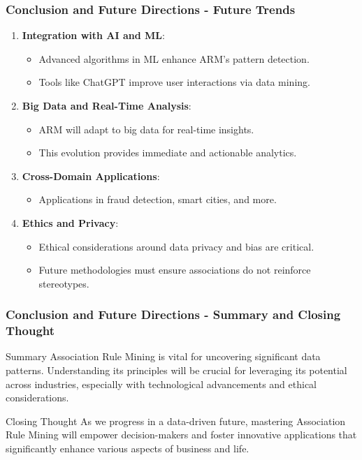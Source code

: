 \documentclass[aspectratio=169]{beamer}
\begin{document}
\begin{frame}[fragile]
    \frametitle{Conclusion and Future Directions - Future Trends}
    \begin{enumerate}
        \item \textbf{Integration with AI and ML}:
            \begin{itemize}
                \item Advanced algorithms in ML enhance ARM's pattern detection.
                \item Tools like ChatGPT improve user interactions via data mining.
            \end{itemize}
        
        \item \textbf{Big Data and Real-Time Analysis}:
            \begin{itemize}
                \item ARM will adapt to big data for real-time insights.
                \item This evolution provides immediate and actionable analytics.
            \end{itemize}
        
        \item \textbf{Cross-Domain Applications}:
            \begin{itemize}
                \item Applications in fraud detection, smart cities, and more.
            \end{itemize}
        
        \item \textbf{Ethics and Privacy}:
            \begin{itemize}
                \item Ethical considerations around data privacy and bias are critical.
                \item Future methodologies must ensure associations do not reinforce stereotypes.
            \end{itemize}
    \end{enumerate}
\end{frame}

\begin{frame}[fragile]
    \frametitle{Conclusion and Future Directions - Summary and Closing Thought}
    \begin{block}{Summary}
        Association Rule Mining is vital for uncovering significant data patterns. 
        Understanding its principles will be crucial for leveraging its potential across industries, especially with technological advancements and ethical considerations.
    \end{block}

    \begin{block}{Closing Thought}
        As we progress in a data-driven future, mastering Association Rule Mining will empower decision-makers and foster innovative applications that significantly enhance various aspects of business and life.
    \end{block}
\end{frame}
\end{document}
